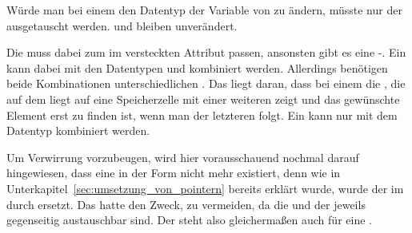 Würde man bei einem  den Datentyp der Variable  von  zu  ändern, müsste nur der  ausgetauscht werden.  und  bleiben unverändert.

Die  muss dabei zum  im \textcolor{gray!90!black}{versteckten Attribut}  passen, ansonsten gibt es eine -. Ein   kann dabei mit den Datentypen   und   kombiniert werden. Allerdings benötigen beide Kombinationen unterschiedlichen . Das liegt daran, dass bei einem   die , die auf dem   liegt auf eine Speicherzelle mit einer weiteren  zeigt und das gewünschte Element erst zu finden ist, wenn man der letzteren  folgt. Ein   kann nur mit dem Datentyp   kombiniert werden.

\begin{Special_Paragraph}
Um Verwirrung vorzubeugen, wird hier vorausschauend nochmal darauf hingewiesen, dass eine  in der Form  nicht mehr existiert, denn wie in Unterkapitel~\ref{sec:umsetzung_von_pointern} bereits erklärt wurde, wurde der   im  durch  ersetzt. Das hatte den Zweck,  zu vermeiden, da die  und der  jeweils gegenseitig austauschbar sind. Der  steht also gleichermaßen auch für eine .
\end{Special_Paragraph}

